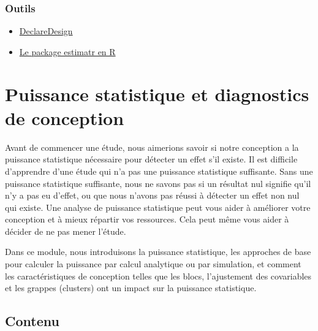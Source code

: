 \documentclass[12pt,]{book}
\begin{document}
\hypertarget{outils-2}{%
\subsection{Outils}\label{outils-2}}

\begin{itemize}
\item
  \href{https://declaredesign.org}{DeclareDesign}
\item
  \href{https://declaredesign.org/r/estimatr/}{Le package estimatr en R}
\end{itemize}

\hypertarget{puissance-statistique-et-diagnostics-de-conception}{%
\chapter{Puissance statistique et diagnostics de conception}\label{puissance-statistique-et-diagnostics-de-conception}}

Avant de commencer une étude, nous aimerions savoir si notre conception a la puissance statistique nécessaire pour détecter un effet s'il existe. Il est difficile d'apprendre d'une étude qui n'a pas une puissance statistique suffisante. Sans une puissance statistique suffisante, nous ne savons pas si un résultat nul signifie qu'il n'y a pas eu d'effet, ou que nous n'avons pas réussi à détecter un effet non nul qui existe. Une analyse de puissance statistique peut vous aider à améliorer votre conception et à mieux répartir vos ressources. Cela peut même vous aider à décider de ne pas mener l'étude.

Dans ce module, nous introduisons la puissance statistique, les approches de base pour calculer la puissance par calcul analytique ou par simulation, et comment les caractéristiques de conception telles que les blocs, l'ajustement des covariables et les grappes (clusters) ont un impact sur la puissance statistique.

\hypertarget{contenu-5}{%
\section{Contenu}\label{contenu-5}}
\end{document}
